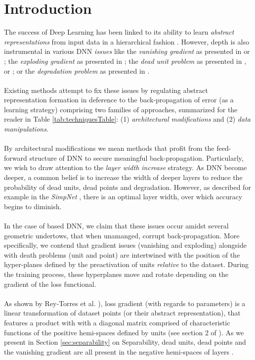 \section{Introduction}\label{sec:introduction}
The success of Deep Learning has been linked to its ability to learn \emph{abstract representations} from input data in a hierarchical fashion  \cite{LeCun06atutorial,ramachandranEtAl2017SearchingForActivationFunctions}. However, depth is also instrumental in various DNN \emph{issues} like the \emph{vanishing gradient} as presented in \cite{vanishing1} or \cite{vanishing2}; the \emph{exploding gradient} as presented in \cite{exploding}; the \emph{dead unit problem} as presented in \cite{leaky},\cite{whyreludie} or \cite{whenneuronsfail}; or the \emph{degradation problem} as presented in \cite{resnet}. 
\\\\
Existing methods attempt to fix these issues by regulating abstract representation formation in deference to the back-propagation of error (as a learning strategy) comprising two families of approaches, summarized for the reader in Table \ref{tab:techniquesTable}: (1) \emph{architectural modifications} and (2) \emph{data manipulations}. 
\\\\
By architectural modifications we mean methods that profit from the feed-forward structure of DNN to secure meaningful back-propagation. Particularly, we wish to draw attention to the \emph{layer width increase} strategy. As DNN become deeper, a common belief is to increase the width of deeper layers to reduce the probability of dead units, dead points and degradation. However, as described for example in the \emph{SimpNet} \cite{simpnet}, there is an optimal layer width, over which accuracy begins to diminish.  
\\\\
In the case of \ReLU based DNN, we claim that these issues occur amidst several geometric undertows, that when unamanged, corrupt back-propagation. More specifically, we contend that gradient issues (vanishing and exploding) alongside with death problems (unit and point) are intertwined with the position of the hyper-planes defined by the preactivation of \ReLU units \emph{relative} to the dataset. During the training process, these hyperplanes move and rotate depending on the gradient of the loss functional.    
\\\\
As shown by Rey-Torres et al. \cite{reyRiera2019ModellingClassificationReLU}), loss gradient (with regards to parameters) is a linear transformation of dataset points (or their abstract representation), that features a product with with a diagonal matrix comprised of characteristic functions of the positive hemi-spaces defined by units (see section 2 of \cite{reyRiera2019ModellingClassificationReLU}). As we present in Section \ref{sec:separability} on Separability, dead units, dead points and the vanishing gradient are all present in the negative hemi-spaces of layers \cite{reyRiera2019ModellingClassificationReLU}. 
